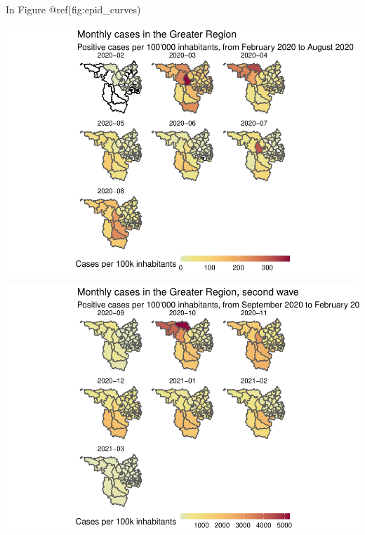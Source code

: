 \documentclass{article}
\newenvironment{Shaded}{\begin{snugshade}}{\end{snugshade}}
\newcommand{\FunctionTok}[1]{\textcolor[rgb]{0.00,0.00,0.00}{#1}}
\newcommand{\NormalTok}[1]{#1}
\newcommand{\SpecialCharTok}[1]{\textcolor[rgb]{0.00,0.00,0.00}{#1}}
\begin{document}
In Figure @ref(fig:epid\_curves)

\begin{Shaded}
\end{Shaded}

\includegraphics[width=1\linewidth]{paper_files/figure-latex/unnamed-chunk-1-1}

\begin{Shaded}
\end{Shaded}

\includegraphics[width=1\linewidth]{paper_files/figure-latex/unnamed-chunk-2-1}
\end{document}
